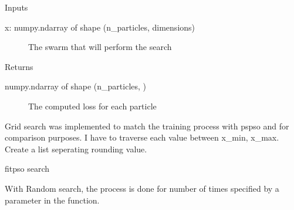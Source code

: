 \documentclass[letterpaper,10pt,english]{sphinxmanual}
\begin{document}
\begin{fulllineitems}
\begin{fulllineitems}
Inputs
\begin{description}
\item[{x: numpy.ndarray of shape (n\_particles, dimensions)}] \leavevmode
The swarm that will perform the search

\end{description}

Returns
\begin{description}
\item[{numpy.ndarray of shape (n\_particles, )}] \leavevmode
The computed loss for each particle

\end{description}

\end{fulllineitems}


\begin{fulllineitems}
\label{\detokenize{index:pspso.pspso.fitpsgrid}}
Grid search was implemented to match the training process with pspso and for comparison purposes.
I have to traverse each value between x\_min, x\_max. Create a list seperating rounding value.

\end{fulllineitems}


\begin{fulllineitems}
\label{\detokenize{index:pspso.pspso.fitpspso}}
fitpso search

\end{fulllineitems}


\begin{fulllineitems}
\label{\detokenize{index:pspso.pspso.fitpsrandom}}
With Random search, the process is done for number of times specified by a parameter in the function.


\end{fulllineitems}
\end{fulllineitems}
\end{document}
